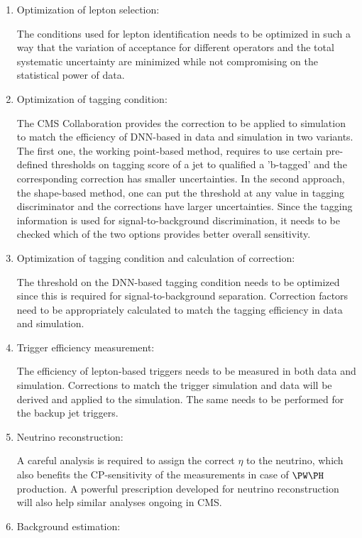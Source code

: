 \documentclass[a4paper,11pt]{article}
\newcommand{\Pb}{{{\Pqb}}\xspace}
\begin{document}
{\begin{enumerate}
\item Optimization of lepton selection:

The conditions used for lepton identification needs to be optimized in such a way that the variation of acceptance for different operators and the total systematic uncertainty are minimized while not compromising on the statistical power of data. 

\item Optimization of \Pb tagging condition: 

The CMS Collaboration provides the correction to be applied to simulation to match the efficiency of DNN-based \Pb in data and simulation in two variants. 
The first one, the working point-based method, requires to use certain pre-defined thresholds on \Pb tagging score of a jet to qualified a 'b-tagged' and the corresponding correction has smaller uncertainties. 
In the second approach, the shape-based method, one can put the threshold at any value in \Pb tagging discriminator and the corrections have larger uncertainties. Since the \Pb tagging information is used for signal-to-background discrimination, it needs to be checked which of the two options provides better overall sensitivity.  

\item Optimization of \PH tagging condition and calculation of correction:

The threshold on the DNN-based \PH tagging condition needs to be optimized since this is required for signal-to-background separation. 
Correction factors need to be appropriately calculated to match the tagging efficiency in data and simulation.

\item Trigger efficiency measurement:

The efficiency of lepton-based triggers needs to be measured in both data and simulation. 
Corrections to match the trigger simulation and data will be derived and applied to the simulation. 
The same needs to be performed for the backup jet triggers. 

\item Neutrino reconstruction:

A careful analysis is required to assign the correct $\eta$ to the neutrino, which also benefits the CP-sensitivity of the measurements in case of $\PW\PH$ production. 
A powerful prescription developed for neutrino reconstruction will also help similar analyses ongoing in CMS. 

\item Background estimation:


\end{enumerate}}
\end{document}

